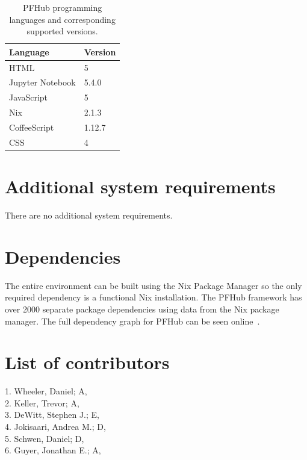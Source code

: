 \documentclass{jors}
\begin{document}
\begin{table}[h!]
  \centering
  \caption{PFHub programming languages and corresponding supported
    versions.}
  \begin{tabular}{|l|l|}
    \hline
    Language         & Version \\
    \hline
    HTML             & 5       \\
    Jupyter Notebook & 5.4.0   \\
    JavaScript       & 5       \\
    Nix              & 2.1.3   \\
    CoffeeScript     & 1.12.7  \\
    CSS              & 4       \\
    \hline
  \end{tabular}
  \label{tab:versions}
\end{table}


\section*{Additional system requirements}

There are no additional system requirements.

\section*{Dependencies}

The entire environment can be built using the Nix Package Manager so
the only required dependency is a functional Nix installation. The
PFHub framework has over 2000 separate package dependencies using
data from the Nix package manager. The full dependency graph for PFHub
can be seen online~\cite{dependencies}.

\section*{List of contributors}

1. Wheeler, Daniel; A,  \\
2. Keller, Trevor; A,  \\
3. DeWitt, Stephen J.; E,  \\
4. Jokisaari, Andrea M.; D,  \\
5. Schwen, Daniel; D,  \\
6. Guyer, Jonathan E.; A,  \\
\end{document}
